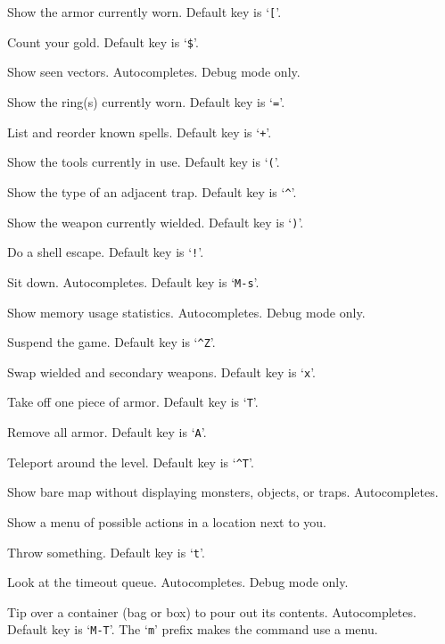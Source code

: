 Show the armor currently worn. Default key is `{\tt [}'.
\item[\tb{\#seegold}]
Count your gold. Default key is `{\tt \$}'.
\item[\tb{\#seenv}]
Show seen vectors.
Autocompletes.
Debug mode only.
\item[\tb{\#seerings}]
Show the ring(s) currently worn. Default key is `{\tt =}'.
\item[\tb{\#seespells}]
List and reorder known spells. Default key is `{\tt +}'.
\item[\tb{\#seetools}]
Show the tools currently in use. Default key is `{\tt (}'.
\item[\tb{\#seetrap}]
Show the type of an adjacent trap. Default key is `{\tt \^{}}'.
\item[\tb{\#seeweapon}]
Show the weapon currently wielded. Default key is `{\tt )}'.
\item[\tb{\#shell}]
Do a shell escape. Default key is `{\tt !}'.
\item[\tb{\#sit}]
Sit down. Autocompletes. Default key is `{\tt M-s}'.
\item[\tb{\#stats}]
Show memory usage statistics.
Autocompletes.
Debug mode only.
\item[\tb{\#suspend}]
Suspend the game. Default key is `{\tt \^{}Z}'.
\item[\tb{\#swap}]
Swap wielded and secondary weapons. Default key is `{\tt x}'.
\item[\tb{\#takeoff}]
Take off one piece of armor. Default key is `{\tt T}'.
\item[\tb{\#takeoffall}]
Remove all armor. Default key is `{\tt A}'.
\item[\tb{\#teleport}]
Teleport around the level. Default key is `{\tt \^{}T}'.
\item[\tb{\#terrain}]
Show bare map without displaying monsters, objects, or traps.
Autocompletes.
\item[\tb{\#therecmdmenu}]
Show a menu of possible actions in a location next to you.
\item[\tb{\#throw}]
Throw something. Default key is `{\tt t}'.
\item[\tb{\#timeout}]
Look at the timeout queue.
Autocompletes.
Debug mode only.
\item[\tb{\#tip}]
Tip over a container (bag or box) to pour out its contents.
Autocompletes. Default key is `{\tt M-T}'.
The `{\tt m}' prefix makes the command use a menu.
